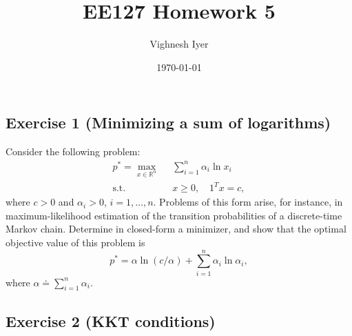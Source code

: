 \documentclass[11pt]{article}
\begin{document}
\title{EE127 Homework 5}
\author{Vighnesh Iyer}
\date{\today}
\maketitle

\subsection*{Exercise 1 (Minimizing a sum of logarithms)}

Consider the following problem:
\begin{align*}
p^*=\max_{x\in\mathbb{R}^{n}}\;\; & \sum_{i=1}^n \alpha_i \ln x_i \\
\text{s.t.}\;\; & x\geq 0,\quad 1^T x = c,
\end{align*}
where $c > 0$ and $\alpha_i > 0$, $i=1,\ldots,n$.
Problems of this form arise, for instance, in maximum-likelihood estimation
of the transition probabilities of a discrete-time Markov chain.
Determine in  closed-form a minimizer, and
show that the optimal objective value  of this  problem is
\[
p^* = \alpha\ln(c/\alpha) +\sum_{i=1}^n \alpha_i\ln\alpha_i,
\]
where $\alpha\doteq \sum_{i=1}^n \alpha_i$.

\begin{solution}
\end{solution}

\newpage
\subsection*{Exercise 2 (KKT conditions)}
\end{document}
